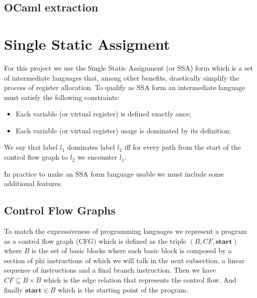 \subsection{OCaml extraction}

\section{Single Static Assigment}
\label{sec:ssa}
For this project we use the Single Static Assignment (or SSA) form which is a set of intermediate languages that, among other benefits, drastically simplify the process of register allocation.
To qualify as SSA form an intermediate language must satisfy the following constraints:
\begin{itemize}
    \item Each variable (or virtual register) is defined exactly once;
    \item Each variable (or virtual register) usage is dominated by its definition;
\end{itemize}
We say that label $l_1$ dominates label $l_2$ iff for every path from the start of the control flow graph to $l_2$ we encounter $l_1$.

In practice to make an SSA form language usable we must include some additional features.

\subsection{Control Flow Graphs}
To match the expressiveness of programming languages we represent a program as a control flow graph (CFG) which is defined as the triple $(B, CF, \textbf{start})$ where $B$ is the set of basic blocks where each basic block is composed by a section of phi instructions of which we will talk in the next subsection, a linear sequence of instructions and a final branch instruction. Then we have $CF \subseteq B \times B$ which is the edge relation that represents the control flow. And finally $\textbf{start} \in B$ which is the starting point of the program.

